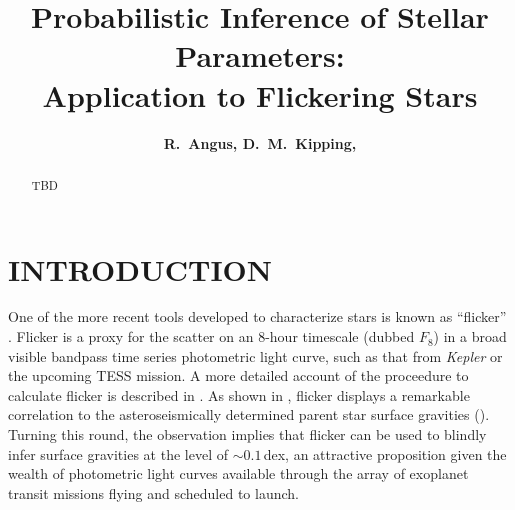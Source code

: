 \documentclass[apjl]{emulateapj}
\newcommand{\titledag}{$\dagger$}
\newcommand{\titledag}{\dagger}
\begin{document}
\title {Probabilistic Inference of Stellar Parameters:\\
Application to Flickering Stars %
\altaffilmark{\titledag}}

\author{
	{\bf	R.~Angus,
		D.~M.~Kipping,
	}
}







\begin{abstract}

TBD

\end{abstract}



\section{INTRODUCTION}
\label{sec:intro}



One of the more recent tools developed to characterize stars is known as 
``flicker'' \citep{bastien:2013}. Flicker is a proxy for the scatter on an 
8-hour timescale (dubbed $F_8$) in a broad visible bandpass time series 
photometric light curve, such as that from \textit{Kepler} or the upcoming TESS 
mission. A more detailed account of the proceedure to calculate flicker is 
described in \citet{bastien:2013}. As shown in \citet{bastien:2013}, flicker 
displays a remarkable correlation to the asteroseismically determined parent 
star surface gravities (\logg). Turning this round, the observation implies 
that flicker can be used to blindly infer surface gravities at the level of 
$\sim0.1$\,dex, an attractive proposition given the wealth of photometric light 
curves available through the array of exoplanet transit missions flying and 
scheduled to launch.
\end{document}

